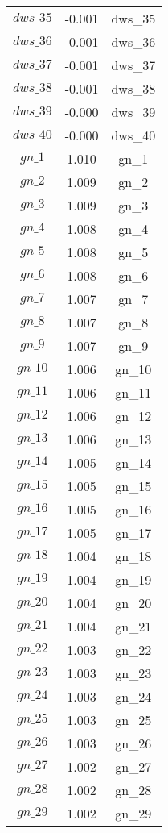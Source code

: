 \begin{center}
\begin{longtable}{ccc}
$dws\_35$ 	 & 	 -0.001 	 & 	 dws\_35\\
$dws\_36$ 	 & 	 -0.001 	 & 	 dws\_36\\
$dws\_37$ 	 & 	 -0.001 	 & 	 dws\_37\\
$dws\_38$ 	 & 	 -0.001 	 & 	 dws\_38\\
$dws\_39$ 	 & 	 -0.000 	 & 	 dws\_39\\
$dws\_40$ 	 & 	 -0.000 	 & 	 dws\_40\\
$gn\_1$ 	 & 	 1.010 	 & 	 gn\_1\\
$gn\_2$ 	 & 	 1.009 	 & 	 gn\_2\\
$gn\_3$ 	 & 	 1.009 	 & 	 gn\_3\\
$gn\_4$ 	 & 	 1.008 	 & 	 gn\_4\\
$gn\_5$ 	 & 	 1.008 	 & 	 gn\_5\\
$gn\_6$ 	 & 	 1.008 	 & 	 gn\_6\\
$gn\_7$ 	 & 	 1.007 	 & 	 gn\_7\\
$gn\_8$ 	 & 	 1.007 	 & 	 gn\_8\\
$gn\_9$ 	 & 	 1.007 	 & 	 gn\_9\\
$gn\_10$ 	 & 	 1.006 	 & 	 gn\_10\\
$gn\_11$ 	 & 	 1.006 	 & 	 gn\_11\\
$gn\_12$ 	 & 	 1.006 	 & 	 gn\_12\\
$gn\_13$ 	 & 	 1.006 	 & 	 gn\_13\\
$gn\_14$ 	 & 	 1.005 	 & 	 gn\_14\\
$gn\_15$ 	 & 	 1.005 	 & 	 gn\_15\\
$gn\_16$ 	 & 	 1.005 	 & 	 gn\_16\\
$gn\_17$ 	 & 	 1.005 	 & 	 gn\_17\\
$gn\_18$ 	 & 	 1.004 	 & 	 gn\_18\\
$gn\_19$ 	 & 	 1.004 	 & 	 gn\_19\\
$gn\_20$ 	 & 	 1.004 	 & 	 gn\_20\\
$gn\_21$ 	 & 	 1.004 	 & 	 gn\_21\\
$gn\_22$ 	 & 	 1.003 	 & 	 gn\_22\\
$gn\_23$ 	 & 	 1.003 	 & 	 gn\_23\\
$gn\_24$ 	 & 	 1.003 	 & 	 gn\_24\\
$gn\_25$ 	 & 	 1.003 	 & 	 gn\_25\\
$gn\_26$ 	 & 	 1.003 	 & 	 gn\_26\\
$gn\_27$ 	 & 	 1.002 	 & 	 gn\_27\\
$gn\_28$ 	 & 	 1.002 	 & 	 gn\_28\\
$gn\_29$ 	 & 	 1.002 	 & 	 gn\_29\\

\end{longtable}
\end{center}
